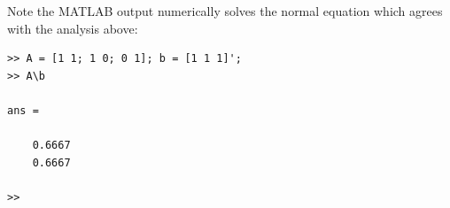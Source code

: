 \documentclass{homework}
\begin{document}
\begin{solution}
Note the MATLAB output numerically solves the normal equation which agrees with the analysis above:
\begin{lstlisting}
>> A = [1 1; 1 0; 0 1]; b = [1 1 1]'; 
>> A\b  
 
ans =
                                                                                                                                            
    0.6667                                                                                                                                  
    0.6667                                                                                                                                  
                                                                                                                                            
>>                                                                                                                                          
\end{lstlisting}
\end{solution}
\end{document}
